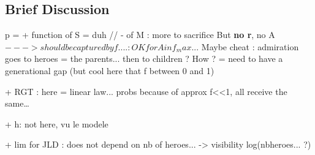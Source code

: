 \documentclass[a4paper,12pt]{report}
\begin{document}
\subsection{Brief Discussion}

p = + function of S = duh // - of M : more to sacrifice
But \textbf{no r}, no A
$---> should be captured by f.... : OK for A in f_max...$
Maybe cheat : admiration goes to heroes = the parents... then to children ? How ?
= need to have a generational gap (but cool here that f between 0 and 1)


+ RGT : here = linear law... probs because of approx f<<1, all receive the same\dots

+ h: not here, vu le modele



+ lim for JLD : does not depend on nb of heroes... -> visibility log(nbheroes... ?)

















\end{document}
